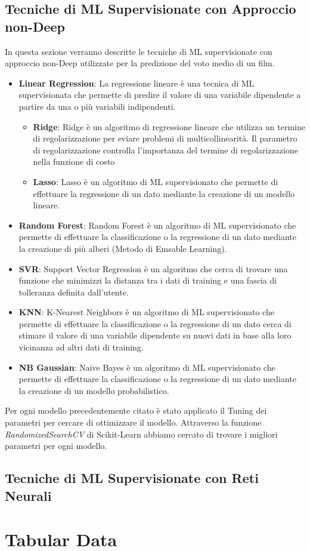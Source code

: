 \documentclass[../../Report.tex]{subfiles}
\begin{document}
\subsection{Tecniche di ML Supervisionate con Approccio non-Deep}
In questa sezione verranno descritte le tecniche di ML supervisionate con approccio non-Deep utilizzate per la predizione del voto medio di un film.
\begin{itemize}
    \item \textbf{Linear Regression}: La regressione lineare è una tecnica di ML supervisionata che permette di predire il valore di una variabile dipendente a partire da una o più variabili indipendenti.
    \begin{itemize}
        \item \textbf{Ridge}: Ridge è un algoritmo di regressione lineare che utilizza un termine di regolarizzazione per eviare problemi di multicollinearità. Il parametro di regolarizzazione controlla l'importanza del termine di regolarizzazione nella funzione di costo
        \item \textbf{Lasso}: Lasso è un algoritmo di ML supervisionato che permette di effettuare la regressione di un dato mediante la creazione di un modello lineare.
    \end{itemize}
    \item \textbf{Random Forest}: Random Forest è un algoritmo di ML supervisionato che permette di effettuare la classificazione o la regressione di un dato mediante la creazione di più alberi (Metodo di Emsable Learning).
    \item \textbf{SVR}: Support Vector Regression è un algoritmo che cerca di trovare una funzione che minimizzi la distanza tra i dati di training e una fascia di tolleranza definita dall'utente.
    \item \textbf{KNN}: K-Nearest Neighbors è un algoritmo di ML supervisionato che permette di effettuare la classificazione o la regressione di un dato cerca di stimare il valore di una variabile dipendente su nuovi dati in base alla loro vicinanza ad altri dati di training.
    \item \textbf{NB Gaussian}: Naive Bayes è un algoritmo di ML supervisionato che permette di effettuare la classificazione o la regressione di un dato mediante la creazione di un modello probabilistico.
\end{itemize}

Per ogni modello precedentemente citato è stato applicato il Tuning dei parametri per cercare di ottimizzare il modello.
Attraverso la funzione \textit{RandomizedSearchCV} di Scikit-Learn abbiamo cercato di trovare i migliori parametri per ogni modello.

\subsection{Tecniche di ML Supervisionate con Reti Neurali}
\section*{Tabular Data}
\end{document}
